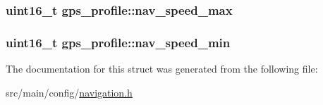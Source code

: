 \hypertarget{structgps__profile_aee5403d5fc109f7e2e382a5448c7c378}{
\subsubsection[{nav\+\_\+speed\+\_\+max}]{\setlength{\rightskip}{0pt plus 5cm}uint16\+\_\+t gps\+\_\+profile\+::nav\+\_\+speed\+\_\+max}}\label{structgps__profile_aee5403d5fc109f7e2e382a5448c7c378}
\hypertarget{structgps__profile_a3c9ed4d00381c2107ca1691c9b28ed91}{
\subsubsection[{nav\+\_\+speed\+\_\+min}]{\setlength{\rightskip}{0pt plus 5cm}uint16\+\_\+t gps\+\_\+profile\+::nav\+\_\+speed\+\_\+min}}\label{structgps__profile_a3c9ed4d00381c2107ca1691c9b28ed91}


The documentation for this struct was generated from the following file\+:\begin{DoxyCompactItemize}
\item 
src/main/config/\hyperlink{config_2navigation_8h}{navigation.\+h}\end{DoxyCompactItemize}

